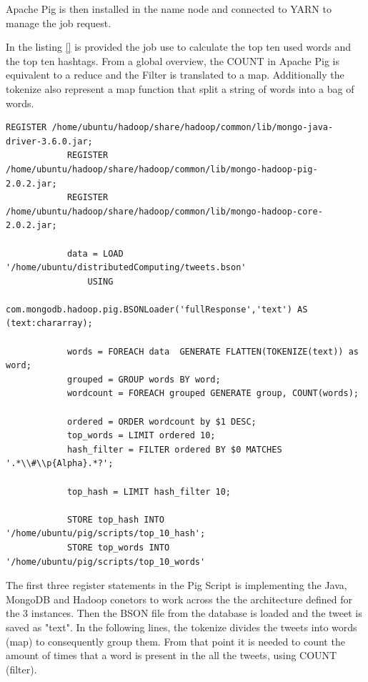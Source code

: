 \documentclass{article}
\begin{document}
        Apache Pig is then installed in the name node and connected to YARN to manage the job request. 
        
        In the listing \ref{} is provided the job use to calculate the top ten used words and the top ten hashtags. From a global overview, the COUNT in Apache Pig is equivalent to a reduce and the Filter is translated to a map.
        Additionally the tokenize also represent a  map function that split a string of words into a bag of words.

        \begin{lstlisting}[caption= Tweet cleaning function, label={lst:dataCleaning}]
            REGISTER /home/ubuntu/hadoop/share/hadoop/common/lib/mongo-java-driver-3.6.0.jar;
            REGISTER /home/ubuntu/hadoop/share/hadoop/common/lib/mongo-hadoop-pig-2.0.2.jar;
            REGISTER /home/ubuntu/hadoop/share/hadoop/common/lib/mongo-hadoop-core-2.0.2.jar;
            
            data = LOAD '/home/ubuntu/distributedComputing/tweets.bson'
                USING
                com.mongodb.hadoop.pig.BSONLoader('fullResponse','text') AS (text:chararray);
            
            words = FOREACH data  GENERATE FLATTEN(TOKENIZE(text)) as word;
            grouped = GROUP words BY word;
            wordcount = FOREACH grouped GENERATE group, COUNT(words);
            
            ordered = ORDER wordcount by $1 DESC;
            top_words = LIMIT ordered 10;
            hash_filter = FILTER ordered BY $0 MATCHES '.*\\#\\p{Alpha}.*?';
            
            top_hash = LIMIT hash_filter 10;

            STORE top_hash INTO '/home/ubuntu/pig/scripts/top_10_hash';
            STORE top_words INTO '/home/ubuntu/pig/scripts/top_10_words'

        \end{lstlisting}

        The first three register statements in the Pig Script is implementing the Java, MongoDB and Hadoop conetors to work across the the architecture defined for the 3 instances. Then
        the BSON file from the database is loaded and the tweet is saved as "text". In the following lines, the tokenize divides the tweets into words (map) to consequently group them.
        From that point it is needed to count the amount of times that a word is present in the all the tweets, using COUNT (filter).
        
\end{document}
